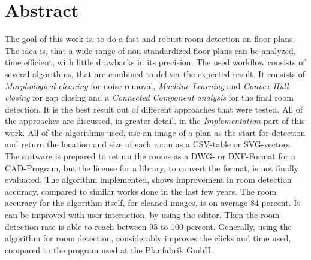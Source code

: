 \section{Abstract}
The goal of this work is, to do a fast and robust room detection on floor plans. The idea is, that a wide range of non standardized floor plans can be analyzed, time efficient, with little drawbacks in its precision.
The used workflow consists of several algorithms, that are combined to deliver the expected result. It consists of \textit{Morphological cleaning} for noise removal, \textit{Machine Learning} and \textit{Convex Hull closing} for gap closing and a \textit{Connected Component analysis} for the final room detection. It is the best result out of different approaches that were tested. All of the approaches are discussed, in greater detail, in the \textit{Implementation} part of this work. All of the algorithms used, use an image of a plan  as the start for detection and return the location and size of each room as a CSV-table or SVG-vectors. The software is prepared to return the rooms as a DWG- or DXF-Format for a CAD-Program, but the license for a library, to convert the format, is not finally evaluated.
The algorithm implemented, shows improvement in room detection accuracy, compared to similar works done in the last few years. The room accuracy for the algorithm itself, for cleaned images, is on average 84 percent. It can be improved with user interaction, by using the editor. Then the room detection rate is able to reach between 95 to 100 percent. Generally, using the algorithm for room detection, considerably improves the clicks and time used, compared to the program used at the Planfabrik GmbH.
